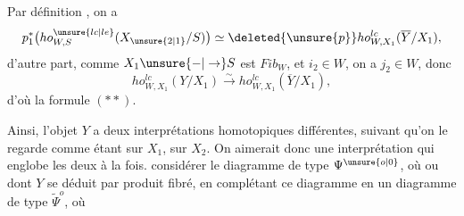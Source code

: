 
Par définition  , on a
\[
 p_1^*\bigl(ho^{\unsure{lc|le}}_{W,S}(X_{\unsure{2|1}}/S)\bigr)
 \simeq \deleted{\unsure{p}}ho^{lc}_{W,X_1}(\overline Y/X_1),
\]
d'autre part, comme $X_1\unsure{-|\to}S$ est  $Fib_W$,  et $i_2\in W$, on a $j_2\in W$, donc
\[
 ho^{lc}_{W,X_1}(Y/X_1)\xrightarrow{\sim}ho^{lc}_{W,X_1}(\overline Y/X_1),
\]
d'où la formule $(**)$.

Ainsi, l'objet $Y$ a deux interprétations homotopiques différentes, suivant qu'on le regarde comme étant sur $X_1$,  sur $X_2$. On aimerait donc une interprétation qui englobe les deux à la fois.    considérer le diagramme
de type $\Psi^{\unsure{o|0}}$, où
ou
dont $Y$ se déduit par produit fibré, en complétant ce diagramme en un diagramme de type $\widetilde\Psi^{o}$, où

